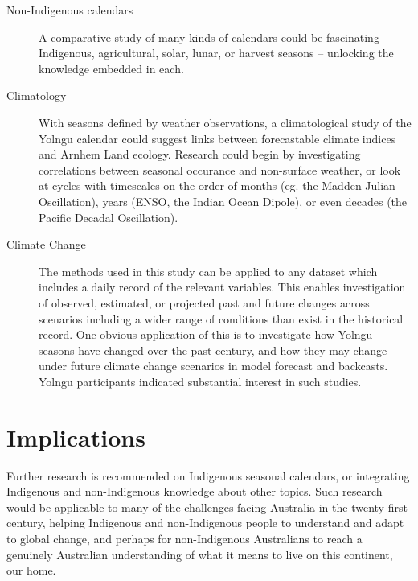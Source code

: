 \begin{description}
\item[Non-Indigenous calendars]
    A comparative study of many kinds of calendars could be fascinating --
    Indigenous, agricultural, solar, lunar, or harvest seasons -- unlocking
    the knowledge embedded in each.

\item[Climatology]
    With seasons defined by weather observations, a climatological study of the
    Yolngu calendar could suggest links between forecastable climate indices
    and Arnhem Land ecology.  Research could begin by investigating correlations
    between seasonal occurance and non-surface weather, or look at cycles with
    timescales on the order of months (eg. the Madden-Julian Oscillation), years (ENSO,
    the Indian Ocean Dipole), or even decades (the Pacific Decadal Oscillation).

\item[Climate Change]
    The methods used in this study can be applied to any dataset which
    includes a daily record of the relevant variables.  This enables
    investigation of observed, estimated, or projected past and future changes
    across scenarios including a wider range of conditions than exist in the historical record.
    One obvious application of this is to investigate how Yolngu seasons have
    changed over the past century, and how they may change under future climate
    change scenarios in model forecast and backcasts.  Yolngu participants
    indicated substantial interest in such studies.
\end{description}



\section{Implications}


Further research is recommended on Indigenous seasonal calendars, or
integrating Indigenous and non-Indigenous knowledge about other topics.  Such
research would be applicable to many of the challenges facing
Australia in the twenty-first century, helping Indigenous and non-Indigenous
people to understand and adapt to global change, and perhaps for non-Indigenous
Australians to reach a genuinely Australian understanding of what it means to
live on this continent, our home.


